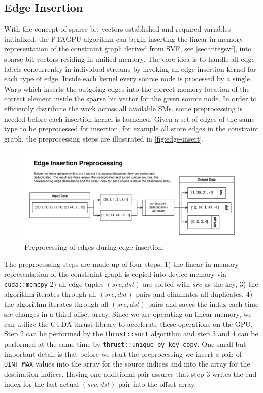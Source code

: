 \subsection{Edge Insertion}
With the concept of sparse bit vectors established and required variables initialized, the PTAGPU algorithm can begin inserting the linear in-memory representation of the constraint graph derived from SVF, see \autoref{sec:integsvf}, into sparse bit vectors residing in unified memory.
The core idea is to handle all edge labels concurrently in individual streams by invoking an edge insertion kernel for each type of edge.
Inside each kernel every source node is processed by a single Warp which inserts the outgoing edges into the correct memory location of the correct element inside the sparse bit vector for the given source node.
In order to efficiently distribute the work across all available SMs, some preprocessing is needed before each insertion kernel is launched.
Given a set of edges of the same type to be preprocessed for insertion, for example all store edges in the constraint graph, the preprocessing steps are illustrated in \autoref{fig:edge-insert}.
\begin{figure}
    \centering
    \includegraphics[width=1.\textwidth]{img/edge-insertion.png}
    \caption[Diagram for Edge Insertion]{Preprocessing of edges during edge insertion.}
    \label{fig:edge-insert}
\end{figure}
The preprocessing steps are made up of four steps, 1) the linear in-memory representation of the constraint graph is copied into device memory via \verb|cuda::memcpy| 2) all edge tuples $(src,dst)$ are sorted with $src$ as the key, 3) the algorithm iterates through all $(src,dst)$ pairs and eliminates all duplicates, 4) the algorithm iterates through all $(src,dst)$ pairs and saves the index each time src changes in a third offset array.
Since we are operating on linear memory, we can utilize the CUDA thrust library to accelerate these operations on the GPU.
Step 2 can be performed by the \verb|thrust::sort| algorithm and step 3 and 4 can be performed at the same time by \verb|thrust::unique_by_key_copy|.
One small but important detail is that before we start the preprocessing we insert a pair of \verb|UINT_MAX| values into the array for the source indices and into the array for the destination indices.
Having one additional pair assures that step 3 writes the end index for the last actual $(src,dst)$ pair into the offset array.

